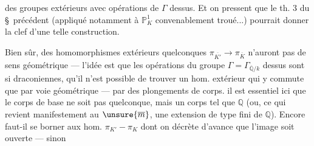 des groupes  extérieurs avec opérations de $\Gamma$ dessus. Et on pressent que le th. 3 du \S\ précédent (appliqué notamment à $\mathbb P_K^1$ convenablement troué...) pourrait donner la clef d'une telle construction.

Bien  sûr, des homomorphismes extérieurs quelconques $\pi_{\overline{K'}}\longrightarrow\pi_{\overline K}$ n'auront pas de sens géométrique --- l'idée est que les opérations du groupe $\Gamma=\Gamma_{\overline{\mathbb Q}/k}$ dessus sont si draconiennes, qu'il n'est possible de trouver un hom. extérieur qui y commute que par voie géométrique --- par des plongements de corps.  il est essentiel ici que le corps de base ne soit pas quelconque, mais un corps tel que $\mathbb Q$ (ou, ce qui revient manifestement au $\unsure{\overline m}$, une extension de type fini de $\mathbb Q$). Encore faut-il se borner aux hom. $\pi_{K'}-\pi_K$ dont on décrète d'avance que l'image soit ouverte --- sinon
